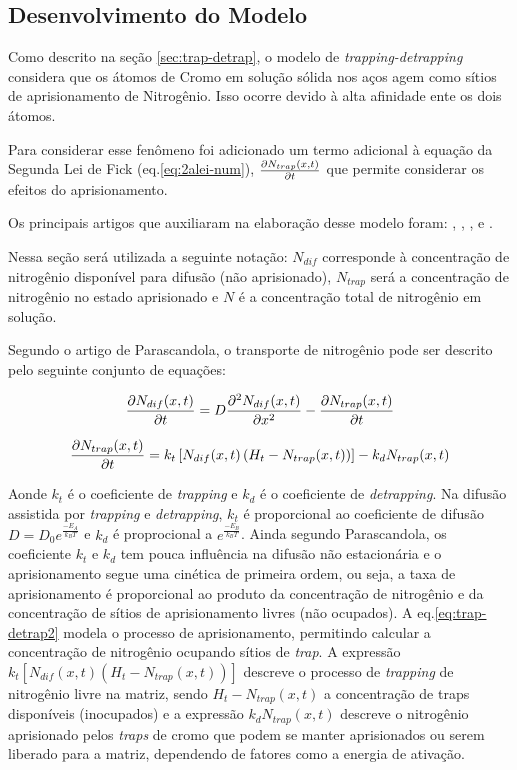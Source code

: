 \subsection{Desenvolvimento do Modelo}
\label{sec:trap-detrap-desenvolvimento}
Como descrito na seção \autoref{sec:trap-detrap}, o modelo de \textit{trapping-detrapping} considera que os átomos de Cromo em solução sólida nos aços agem como sítios de aprisionamento de Nitrogênio. Isso ocorre devido à alta afinidade ente os dois átomos.

Para considerar esse fenômeno foi adicionado um termo adicional à equação da Segunda Lei de Fick (eq.\autoref{eq:2alei-num}), $\pdv{N_{trap}(x,t)}{t}$ que permite considerar os efeitos do aprisionamento. 

Os principais artigos que auxiliaram na elaboração desse modelo foram:
\cite{moskalioviene2011modeling}, \cite{parascandola2000nitrogen}, \cite{moller1983pidat}, \cite{peng2018numerical} e \cite{moller2001surface}.  

Nessa seção será utilizada a seguinte notação: $N_{dif}$ corresponde à concentração de nitrogênio disponível para difusão (não aprisionado), $N_{trap}$ será a concentração de nitrogênio no estado aprisionado e $N$ é a concentração total de nitrogênio em solução.

Segundo o artigo de Parascandola, o transporte de nitrogênio pode ser descrito pelo seguinte conjunto de equações:

\begin{equation}
\label{eq:trap-detrap}
\pdv{N_{dif}(x,t)}{t} = D\pdv[2]{N_{dif}(x,t)}{x} - \pdv{N_{trap}(x,t)}{t} 
\end{equation}

\begin{equation}
\label{eq:trap-detrap2}
\pdv{N_{trap}(x,t)}{t} = k_t\left[N_{dif}(x,t)\left(H_t-N_{trap}(x,t)\right)\right] - k_dN_{trap}(x,t)
\end{equation}

Aonde $k_t$ é o coeficiente de \textit{trapping} e $k_d$ é o coeficiente de \textit{detrapping}. Na difusão assistida por \textit{trapping} e \textit{detrapping}, $k_t$ é proporcional ao coeficiente de difusão ${D=D_0e^{\frac{-E_A}{k_BT}}}$ e $k_d$ é proprocional a ${e^{\frac{-E_B}{k_BT}}}$. Ainda segundo Parascandola, os coeficiente $k_t$ e $k_d$ tem pouca influência na difusão não estacionária e o aprisionamento segue uma cinética de primeira ordem, ou seja, a taxa de aprisionamento é proporcional ao produto da concentração de nitrogênio e da concentração de sítios de aprisionamento livres (não ocupados). A eq.\autoref{eq:trap-detrap2} modela o processo de aprisionamento, permitindo calcular a concentração de nitrogênio ocupando sítios de \textit{trap}. A expressão $k_t\left[N_{dif}(x,t)\left(H_t-N_{trap}(x,t)\right)\right]$ descreve o processo de \textit{trapping} de nitrogênio livre na matriz, sendo $H_t - N_{trap}(x,t)$ a concentração de traps disponíveis (inocupados) e a expressão $ k_dN_{trap}(x,t)$ descreve o nitrogênio aprisionado pelos \textit{traps} de cromo que podem se manter aprisionados ou serem liberado para a matriz, dependendo de fatores como a energia de ativação.


